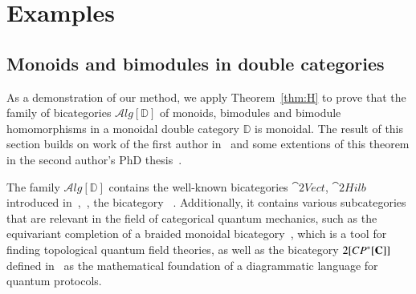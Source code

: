 \section{Examples}\label{sec:Alg} 

\subsection*{Monoids and bimodules in double categories}
\label{sec:mod}

As a demonstration of our method, we apply Theorem~\ref{thm:H} to prove that the family of bicategories $\mathcal{A}lg[{\mathbb{D}}]$ of monoids, bimodules and bimodule homomorphisms in a monoidal double category $\mathbb{D}$ is monoidal. The result of this section builds on work of the first author in~\cite[Theorem 11.5]{shulman:frbi} and some extentions of this theorem in the second author's PhD thesis~\cite[Chapter 5]{westerPhDthesis}.

The family $\mathcal{A}lg[{\mathbb{D}}]$ contains the well-known bicategories $\cat{2Vect}$, $\cat{2Hilb}$  introduced in~\cite{kapranov562},~\cite{baez2004higher}, the bicategory ~\cite{benabou}. Additionally, it contains various subcategories that are relevant in the field of categorical quantum mechanics, such as the equivariant completion of a braided monoidal bicategory~\cite{carquevillerunkel}, which is a tool for finding topological quantum field theories, as well as the bicategory $2[CP^*[{\bf C}]]$ defined in~\cite{heunenvicarywester} as the mathematical foundation of a diagrammatic language for quantum protocols. %

